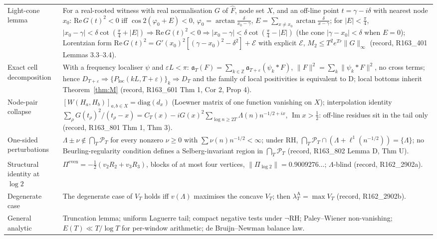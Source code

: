 \documentclass[11pt]{amsart}
\theoremstyle{definition}
\theoremstyle{remark}
\newcommand{\Z}{\mathbb Z}
\newcommand{\Iml}{\operatorname{Im}}
\newcommand{\PT}{\mathcal P_T}
\newcommand{\lamA}{\lambda^{\mathrm A}_T}
\begin{document}
\begin{longtable}{@{}p{4.2cm}p{10.3cm}@{}}
Light-cone lemma & For a real-rooted witness with real normalisation $G$ of $\widehat F$, node set $X$, and an off-line point $t=\gamma-i\delta$ with nearest node $x_0$: $\mathrm{Re}\,G(t)^2<0$ iff $\cos2(\varphi_0+E)<0$, $\varphi_0=\arctan\frac{\delta}{x_0-\gamma}$, $E=\sum_{x\ne x_0}\arctan\frac{\delta}{x-\gamma}$; for $|E|<\frac\pi4$, $|x_0-\gamma|<\delta\cot(\frac\pi4+|E|)\Rightarrow\mathrm{Re}\,G(t)^2<0\Rightarrow|x_0-\gamma|<\delta\cot(\frac\pi4-|E|)$ (the cone $|\gamma-x_0|<\delta$ when $E=0$); Lorentzian form $\mathrm{Re}\,G(t)^2=G'(x_0)^2[(\gamma-x_0)^2-\delta^2]+\mathcal E$ with explicit $\mathcal E$, $M_2\le T^2e^{Tr}\|G\|_\infty$ (record, R163\_401 Lemmas 3.3--3.4). \\
Exact cell decomposition & With a frequency localiser $\psi$ and $\varepsilon L<\pi$: $\mathfrak a_T(F)=\sum_{k\in\Z}\mathfrak a_{T+\varepsilon}(\psi_k*F)$, $\|F\|^2=\sum_k\|\psi_k*F\|^2$, no cross terms; hence $D_{T+\varepsilon}\Rightarrow\{P_{\mathrm{loc}}(kL,T+\varepsilon)\}_k\Rightarrow D_T$ and the family of local positivities is equivalent to D; local bottoms inherit Theorem~\ref{thm:M} (record, R163\_601 Thm 1, Cor 2, Prop 4). \\
Node-pair collapse & $[W(H_a,H_b)]_{a,b\in X}=\mathrm{diag}(d_x)$ (Loewner matrix of one function vanishing on $X$); interpolation identity $\sum_\rho G(t_\rho)^2/(t_\rho-x)=C_T(x)-iG(x)^2\sum_{\log n\ge2T}\Lambda(n)n^{-1/2+ix}$, $\Iml x>\frac12$: off-line residues sit in the tail only (record, R163\_801 Thm 1, Thm 3). \\
One-sided perturbations & $\Lambda\pm\nu\notin\bigcap_T\PT$ for every nonzero $\nu\ge0$ with $\sum\nu(n)n^{-1/2}<\infty$; under RH, $\bigcap_T\PT\cap(\Lambda+\ell^1(n^{-1/2}))=\{\Lambda\}$; no Beurling-regularity condition defines a Selberg-invariant region in $\bigcap_T\PT$ (record, R163\_802 Lemma D, Thm U). \\
Structural identity at $\log2$ & $\Pi^{\mathrm{even}}=-\frac12(v_2R_2+v_3R_3)$, blocks of at most four vertices, $\|\Pi_{\log2}\|=0.9009276\ldots$; $\Lambda$-blind (record, R162\_2902a). \\
Degenerate case & The degenerate case of $V_T$ holds iff $v(\Lambda)$ maximises the concave $V_T$; then $\lamA=\max V_T$ (record, R162\_2902b). \\
General analytic & Truncation lemma; uniform Laguerre tail; compact negative tests under $\neg$RH; Paley--Wiener non-vanishing; $E(T)\ll T/\log T$ for per-window arithmetic; de Bruijn--Newman balance law. \\
\end{longtable}
\end{document}
